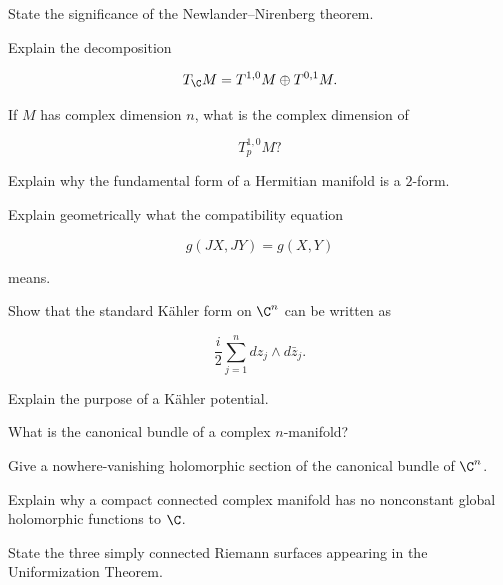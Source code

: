 \begin{exercise}[3]
State the significance of the Newlander--Nirenberg theorem.
\end{exercise}

\begin{exercise}[3]
Explain the decomposition

\[
T_{\C}M
=
T^{1,0}M
\oplus
T^{0,1}M.
\]
\end{exercise}

\begin{exercise}[3]
If \(M\) has complex dimension \(n\), what is the complex dimension of

\[
T_p^{1,0}M?
\]
\end{exercise}

\begin{exercise}[3]
Explain why the fundamental form of a Hermitian manifold is a \(2\)-form.
\end{exercise}

\begin{exercise}[3]
Explain geometrically what the compatibility equation

\[
g(JX,JY)=g(X,Y)
\]

means.
\end{exercise}

\begin{exercise}[3]
Show that the standard K\"ahler form on \(\C^n\) can be written as

\[
\frac{i}{2}
\sum_{j=1}^{n}
dz_j\wedge d\bar z_j.
\]
\end{exercise}

\begin{exercise}[3]
Explain the purpose of a K\"ahler potential.
\end{exercise}

\begin{exercise}[3]
What is the canonical bundle of a complex \(n\)-manifold?
\end{exercise}

\begin{exercise}[3]
Give a nowhere-vanishing holomorphic section of the canonical bundle of
\(\C^n\).
\end{exercise}

\begin{exercise}[3]
Explain why a compact connected complex manifold has no nonconstant global
holomorphic functions to \(\C\).
\end{exercise}

\begin{exercise}[3]
State the three simply connected Riemann surfaces appearing in the
Uniformization Theorem.
\end{exercise}

